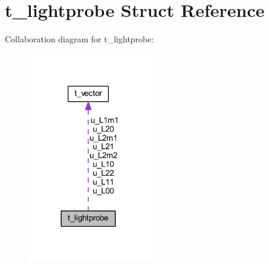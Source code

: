 \hypertarget{structt__lightprobe}{}\section{t\+\_\+lightprobe Struct Reference}
\label{structt__lightprobe}


Collaboration diagram for t\+\_\+lightprobe\+:
\nopagebreak
\begin{figure}[H]
\begin{center}
\leavevmode
\includegraphics[width=152pt]{structt__lightprobe__coll__graph}
\end{center}
\end{figure}
